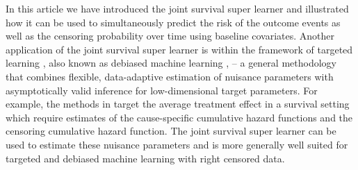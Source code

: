 \documentclass[lineno]{biometrika}
\newcommand{\1}{\mathds{1}}
\begin{document}


In this article we have introduced the joint survival super learner
and illustrated how it can be used to simultaneously predict the risk
of the outcome events as well as the censoring probability over time
using baseline covariates. Another application of the joint survival
super learner is within the framework of targeted learning
\citep{van2011targeted}, also known as debiased machine learning
\citep{chernozhukov2018double}, -- a general methodology that combines
flexible, data-adaptive estimation of nuisance parameters with
asymptotically valid inference for low-dimensional target parameters.
For example, the methods in \cite{van2003unified,rytgaard2022targeted}
target the average treatment effect in a survival setting which
require estimates of the cause-specific cumulative hazard functions
and the censoring cumulative hazard function. The joint survival super
learner can be used to estimate these nuisance parameters and is more
generally well suited for targeted and debiased machine learning with
right censored data. 
\end{document}
